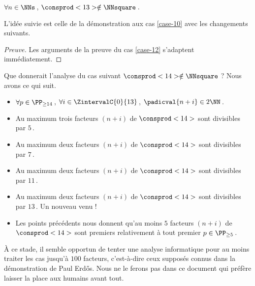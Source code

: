 \begin{fact} \label{case-13}
	 $\forall n \in \NNs$\,, $\consprod<13> \notin \NNsquare$\,.
\end{fact}



L'idée suivie est celle de la démonstration aux cas \ref{case-10} avec les changements suivants.


\begin{proof}[Preuve]%
    Les arguments de la preuve du cas \ref{case-12} s'adaptent immédiatement.
\end{proof}




\begin{remark}
	Que donnerait l'analyse du cas suivant $\consprod<14> \notin \NNsquare$ ?
	Nous avons ce qui suit.
    \begin{itemize}
		\item $\forall p \in \PP_{\geq 14}$\,, 
    $\forall i \in \ZintervalC{0}{13}$\,, 
    $\padicval{n + i} \in 2 \NN$\,.
		
		\item Au maximum trois facteurs $(n + i)$ de $\consprod<14>$ sont divisibles par $5$\,.

		\item Au maximum deux facteurs $(n + i)$ de $\consprod<14>$ sont divisibles par $7$\,.

		\item Au maximum deux facteurs $(n + i)$ de $\consprod<14>$ sont divisibles par $11$\,.

		\item Au maximum deux facteurs $(n + i)$ de $\consprod<14>$ sont divisibles par $13$\,. Un nouveau venu !

		\item Les points précédents nous donnent qu'au moins $5$ facteurs $(n + i)$ de $\consprod<14>$ sont premiers relativement à tout premier $p \in \PP_{\geq 5}$\,.
    \end{itemize}
    
    À ce stade, il semble opportun de tenter une analyse informatique pour au moins traiter les cas jusqu'à $100$ facteurs, c'est-à-dire ceux supposés connus dans la démonstration de Paul Erdős. Nous ne le ferons pas dans ce document qui préfère laisser la place aux humains avant tout.
\end{remark}
